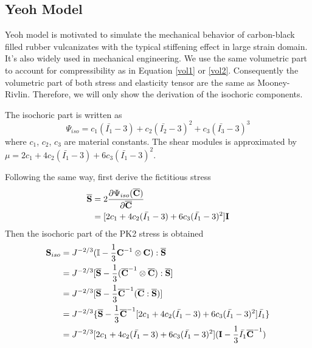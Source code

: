 %
\subsection{Yeoh Model}
Yeoh model is motivated to simulate the mechanical behavior of carbon-black filled rubber vulcanizates with the typical stiffening effect in large strain domain. It's also widely used in mechanical engineering. We use the same volumetric part to account for compressibility as in Equation \ref{vol1} or \ref{vol2}. Consequently the volumetric part of both stress and elasticity tensor are the same as Mooney-Rivlin. Therefore, we will only show the derivation of the isochoric components.

%
The isochoric part is written as
\begin{equation} \label{isopart}
\Psi_{iso} = c_1(\bar{I_1} - 3) + c_2(\bar{I_2} - 3)^2 + c_3(\bar{I_3} - 3)^3
\end{equation}
where $c_1$, $c_2$, $c_3$ are material constants. The shear modules is approximated by $\mu = 2c_1 + 4c_2(\bar{I_1} - 3) + 6c_3(\bar{I_1} - 3)^2$.

%
Following the same way, first derive the fictitious stress
\begin{equation} \label{yfictitious}
\begin{split}
\overline{\bold{S}} &= 2\frac{\partial\Psi_{iso}({\overline{\bold{C}})}}{\partial\overline{\bold{C}}} \\
&= [2c_1 + 4c_2(\bar{I_1} - 3) + 6c_3(\bar{I_1} - 3)^2] \bold{I} \\
\end{split}
\end{equation}
Then the isochoric part of the PK2 stress is obtained
\begin{equation} \label{ySiso}
\begin{split}
{\bold{S}}_{iso} &= J^{-2/3}(\mathbb{I} - \frac{1}{3}\bold{C}^{-1} \otimes \bold{C}) : \overline{\bold{S}}\\
&= J^{-2/3} [\overline{\bold{S}} - \frac{1}{3}({\overline{\bold{C}}}^{-1} \otimes  {\overline{\bold{C}}}) :  \overline{\bold{S}}] \\
&= J^{-2/3}[\overline{\bold{S}} - \frac{1}{3} \overline{\bold{C}}^{-1}  (\overline{\bold{C}} : \overline{\bold{S}})] \\
&= J^{-2/3}\{\overline{\bold{S}} - \frac{1}{3} \overline{\bold{C}}^{-1} [2c_1 + 4c_2(\bar{I_1} - 3) + 6c_3(\bar{I_1} - 3)^2] \bar{I_1}\}\\
&= J^{-2/3}[2c_1 + 4c_2(\bar{I_1} - 3) + 6c_3(\bar{I_1} - 3)^2] (\bold{I} - \frac{1}{3}\bar{I_1}{\overline{\bold{C}}}^{-1})
\end{split}
\end{equation}

